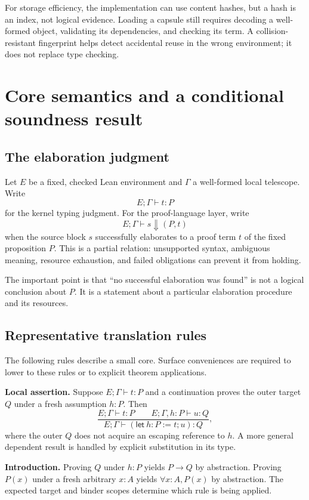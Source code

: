 \documentclass[11pt,a4paper]{article}
\theoremstyle{remark}
\begin{document}
For storage efficiency, the implementation can use content hashes, but a hash is an index, not logical evidence. Loading a capsule still requires decoding a well-formed object, validating its dependencies, and checking its term. A collision-resistant fingerprint helps detect accidental reuse in the wrong environment; it does not replace type checking.

\section{Core semantics and a conditional soundness result}\label{sec:semantics}

\subsection{The elaboration judgment}
Let $E$ be a fixed, checked Lean environment and $\Gamma$ a well-formed local telescope. Write
\[
E;\Gamma\vdash t:P
\]
for the kernel typing judgment. For the proof-language layer, write
\[
E;\Gamma\vdash s\Downarrow(P,t)
\]
when the source block $s$ successfully elaborates to a proof term $t$ of the fixed proposition $P$. This is a partial relation: unsupported syntax, ambiguous meaning, resource exhaustion, and failed obligations can prevent it from holding.

The important point is that ``no successful elaboration was found'' is not a logical conclusion about $P$. It is a statement about a particular elaboration procedure and its resources.

\subsection{Representative translation rules}
The following rules describe a small core. Surface conveniences are required to lower to these rules or to explicit theorem applications.

\textbf{Local assertion.} Suppose $E;\Gamma\vdash t:P$ and a continuation proves the outer target $Q$ under a fresh assumption $h:P$. Then
\[
\frac{E;\Gamma\vdash t:P\qquad E;\Gamma,h:P\vdash u:Q}
{E;\Gamma\vdash (\mathsf{let}\ h:P:=t;u):Q},
\]
where the outer $Q$ does not acquire an escaping reference to $h$. A more general dependent result is handled by explicit substitution in its type.

\textbf{Introduction.} Proving $Q$ under $h:P$ yields $P\to Q$ by abstraction. Proving $P(x)$ under a fresh arbitrary $x:A$ yields $\forall x:A,P(x)$ by abstraction. The expected target and binder scopes determine which rule is being applied.
\end{document}
